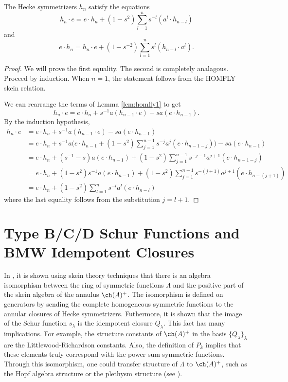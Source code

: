 \begin{theorem} \label{prop:homfly2}
The Hecke symmetrizers $h_n$ satisfy the equations
\[
h_n \cdot e = e \cdot h_n + ( 1 - s^2 ) \sum_{l=1}^{n} s^{-l} ( a^l \cdot h_{n-l} )
\]
and
\[
e \cdot h_n = h_n \cdot e + (1 - s^{-2} ) \sum_{l=1}^{n} s^l ( h_{n-l} \cdot a^l ).
\]
\end{theorem}
\begin{proof}
We will prove the first equality. The second is completely analagous. Proceed by induction. When $n=1$, the statement follows from the HOMFLY skein relation. 

We can rearrange the terms of Lemma \ref{lem:homfly1} to get
\begin{equation} \label{eq:homfly1b}
h_n \cdot e = e \cdot h_n + s^{-1} a ( h_{n-1} \cdot e ) - s a ( e \cdot h_{n-1} ).
\end{equation}
By the induction hypothesis,
\begin{align*}
h_n \cdot e & = e \cdot h_n + s^{-1} a ( h_{n-1} \cdot e ) - s a ( e \cdot h_{n-1} ) \\
& = e \cdot h_n + s^{-1} a \Big( e \cdot h_{n-1} + ( 1 - s^2 ) \sum_{j=1}^{n-1} s^{-j} a^j ( e \cdot h_{n-1-j} ) \Big) - s a ( e \cdot h_{n-1} ) \\
& = e \cdot h_n + ( s^{-1} - s ) a ( e \cdot h_{n-1} ) + ( 1 - s^2 ) \sum_{j=1}^{n-1} s^{-j-1} a^{j+1} ( e \cdot h_{n-1-j} ) \\ 
& = e \cdot h_n + ( 1 - s^2 ) s^{-1} a ( e \cdot h_{n-1} ) + ( 1 - s^2 ) \sum_{j=1}^{n-1} s^{-(j+1)} a^{j+1} ( e \cdot h_{n-(j+1)} ) \\
&= e \cdot h_n + ( 1 - s^2 ) \sum_{l=1}^{n} s^{-l} a^{l} ( e \cdot h_{n-l} )
\end{align*}
where the last equality follows from the substitution $j=l+1$. 
\end{proof}






\section{Type B/C/D Schur Functions and BMW Idempotent Closures} \label{sec:Lukac}
In \cite{Luk05}, it is shown using skein theory techniques that there is an algebra isomorphism between the ring of symmetric functions $\Lambda$ and the positive part of the skein algebra of the annulus $\ch(A)^+$. The isomorphism is defined on generators by sending the complete homogeneous symmetric functions to the annular closures of Hecke symmetrizers. Futhermore, it is shown that the image of the Schur function $s_\lambda$ is the idempotent closure $Q_\lambda$. This fact has many implications. For example, the structure constants of $\ch(A)^+$ in the basis $\{ Q_\lambda \}_\lambda$ are the Littlewood-Richardson constants. Also, the definition of $P_k$ implies that these elements truly correspond with the power sum symmetric functions. Through this isomorphism, one could transfer structure of $\Lambda$ to $\ch(A)^+$, such as the Hopf algebra structure or the plethysm structure (see \cite{MM08}). 

